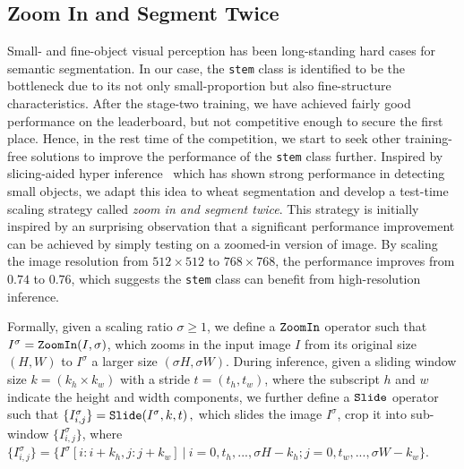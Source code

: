 \subsection{Zoom In and Segment Twice}
Small- and fine-object visual perception has %
been %
long-standing hard cases for %
semantic segmentation. %
In our case, the \texttt{stem} class is identified %
to be the bottleneck due to its not only small-proportion but also fine-structure characteristics. After the stage-two training, we have achieved fairly good performance on the leaderboard, but not competitive enough to secure the first place. Hence, in the rest time of the competition, we start to seek other training-free solutions to improve the performance of the \texttt{stem} class further. %
Inspired by slicing-aided hyper inference~\cite{akyon2022slicing} which has shown strong performance in detecting small objects, we %
adapt this idea to wheat segmentation and develop a test-time scaling strategy called \textit{zoom in and segment twice}. This strategy is initially inspired by an surprising observation that a significant performance improvement can be achieved by simply testing on a zoomed-in version of image. By scaling the image resolution from $512\times512$ to $768\times768$, the performance improves from $0.74$ to $0.76$, which suggests the \texttt{stem} class can benefit from high-resolution inference. 

Formally, given a scaling ratio $\sigma \geq 1$, we define a $\tt{ZoomIn}$ operator such that $I^{\sigma}={\tt{ZoomIn}}(I, \sigma)$, which
zooms in the input image $I$ from its original size $(H,W)$ 
to $I^\sigma$ a larger size $(\sigma H, \sigma W)$. During inference, given a sliding window size $k=(k_h \times k_w)$ with a stride $t=(t_h,t_w)$, where the subscript $h$ and $w$ indicate the height and width components, we further define a $\tt{Slide}$ operator such that 
$
\{I_{i,j}^{\sigma}\}={\tt{Slide}}(I^{\sigma}, k, t) \,,
$
which slides the image $I^{\sigma}$, crop it into sub-window $\{I_{i,j}^{\sigma}\}$, where $\{I_{i,j}^{\sigma}\}=\{I^{\sigma}[i:i+k_h,j:j+k_w]~|~i=0,t_h,...,\sigma H-k_h; j=0,t_w,...,\sigma W-k_w \}$.

